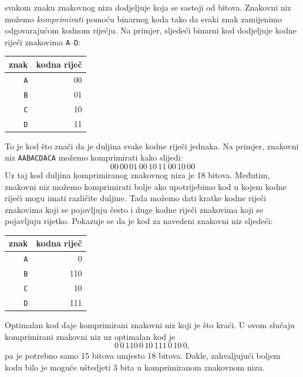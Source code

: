  svakom znaku
znakovnog niza dodjeljuje  koja se sastoji od bitova.
Znakovni niz možemo \emph{komprimirati} pomoću binarnog koda
tako da svaki znak zamijenimo
odgovarajućom kodnom riječju.
Na primjer, sljedeći binarni kod
dodjeljuje kodne riječi znakovima
\texttt{A}–\texttt{D}:
\begin{center}
\begin{tabular}{rr}
znak & kodna riječ \\
\hline
\texttt{A} & 00 \\
\texttt{B} & 01 \\
\texttt{C} & 10 \\
\texttt{D} & 11 \\
\end{tabular}
\end{center}
To je kod 
što znači da je duljina svake
kodne riječi jednaka.
Na primjer, znakovni niz
\texttt{AABACDACA} možemo komprimirati kako slijedi:
\[00\,00\,01\,00\,10\,11\,00\,10\,00\]
Uz taj kod duljina komprimiranog
znakovnog niza je 18 bitova.
Međutim, znakovni niz možemo komprimirati bolje
ako upotrijebimo kod 
u kojem kodne riječi mogu imati različite duljine.
Tada možemo dati kratke kodne riječi
znakovima koji se pojavljuju često
i duge kodne riječi znakovima
koji se pojavljuju rijetko.
Pokazuje se da je  kod
za navedeni znakovni niz sljedeći:
\begin{center}
\begin{tabular}{rr}
znak & kodna riječ \\
\hline
\texttt{A} & 0 \\
\texttt{B} & 110 \\
\texttt{C} & 10 \\
\texttt{D} & 111 \\
\end{tabular}
\end{center}
Optimalan kod daje komprimirani znakovni niz
koji je što kraći.
U ovom slučaju komprimirani znakovni niz uz
optimalan kod je
\[0\,0\,110\,0\,10\,111\,0\,10\,0,\]
pa je potrebno samo 15 bitova umjesto 18 bitova.
Dakle, zahvaljujući boljem kodu bilo je moguće
uštedjeti 3 bita u komprimiranom znakovnom nizu.

